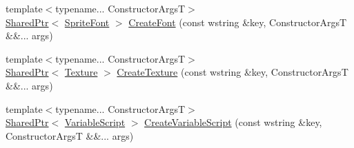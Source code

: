 \begin{DoxyCompactItemize}
\item 
{\footnotesize template$<$typename... Constructor\+ArgsT$>$ }\\\hyperlink{namespacemage_a1e01ae66713838a7a67d30e44c67703e}{Shared\+Ptr}$<$ \hyperlink{classmage_1_1_sprite_font}{Sprite\+Font} $>$ \hyperlink{classmage_1_1_resource_factory_a35aac7cabfd78836e2645db5bd4c5923}{Create\+Font} (const wstring \&key, Constructor\+ArgsT \&\&... args)
\item 
{\footnotesize template$<$typename... Constructor\+ArgsT$>$ }\\\hyperlink{namespacemage_a1e01ae66713838a7a67d30e44c67703e}{Shared\+Ptr}$<$ \hyperlink{classmage_1_1_texture}{Texture} $>$ \hyperlink{classmage_1_1_resource_factory_ace050d1acbdab5586a869df93a747a7a}{Create\+Texture} (const wstring \&key, Constructor\+ArgsT \&\&... args)
\item 
{\footnotesize template$<$typename... Constructor\+ArgsT$>$ }\\\hyperlink{namespacemage_a1e01ae66713838a7a67d30e44c67703e}{Shared\+Ptr}$<$ \hyperlink{classmage_1_1_variable_script}{Variable\+Script} $>$ \hyperlink{classmage_1_1_resource_factory_a6b9a3b595500260cc4004e302a809be4}{Create\+Variable\+Script} (const wstring \&key, Constructor\+ArgsT \&\&... args)
\end{DoxyCompactItemize}
